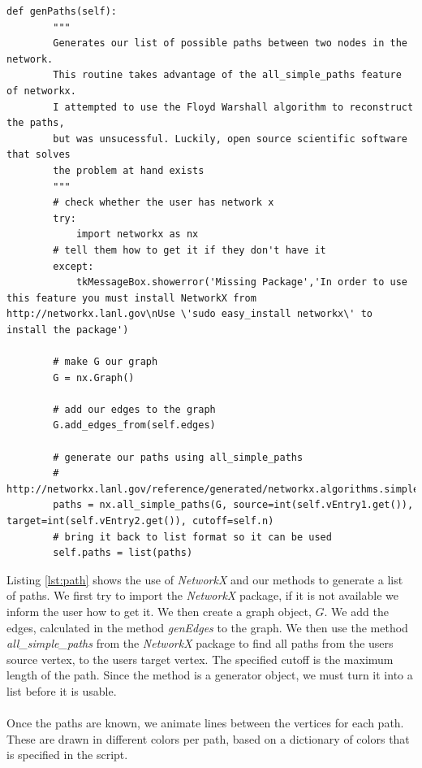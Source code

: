 \begin{lstlisting}[caption={Path Generation}, label=lst:path,firstnumber=83]
    def genPaths(self):
        """
        Generates our list of possible paths between two nodes in the network.
        This routine takes advantage of the all_simple_paths feature of networkx.
        I attempted to use the Floyd Warshall algorithm to reconstruct the paths,
        but was unsucessful. Luckily, open source scientific software that solves
        the problem at hand exists
        """
        # check whether the user has network x
        try:
            import networkx as nx
        # tell them how to get it if they don't have it
        except:
            tkMessageBox.showerror('Missing Package','In order to use this feature you must install NetworkX from http://networkx.lanl.gov\nUse \'sudo easy_install networkx\' to install the package')
        
        # make G our graph
        G = nx.Graph()
        
        # add our edges to the graph
        G.add_edges_from(self.edges)
        
        # generate our paths using all_simple_paths
        # http://networkx.lanl.gov/reference/generated/networkx.algorithms.simple_paths.all_simple_paths.html
        paths = nx.all_simple_paths(G, source=int(self.vEntry1.get()), target=int(self.vEntry2.get()), cutoff=self.n)
        # bring it back to list format so it can be used
        self.paths = list(paths)
\end{lstlisting}\noindent
Listing \ref{lst:path} shows the use of \emph{NetworkX} and our methods to generate a list of paths. We first try to import the \emph{NetworkX} package, if it is not available we inform the user how to get it. We then create a graph object, $G$. We add the edges, calculated in the method \emph{genEdges} to the graph. We then use the method \emph{all\_simple\_paths} from the \emph{NetworkX} package to find all paths from the users source vertex, to the users target vertex. The specified cutoff is the maximum length of the path. Since the method is a generator object, we must turn it into a list before it is usable.\\\\
Once the paths are known, we animate lines between the vertices for each path. These are drawn in different colors per path, based on a dictionary of colors that is specified in the script.
